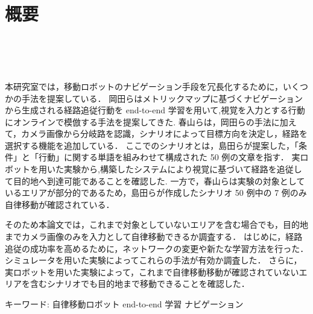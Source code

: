 \chapter*{概要}
\thispagestyle{empty}
%
\begin{center}
  \scalebox{1.0}{視覚と行動のend-to-end学習により}\\
  \vspace{-1.0zh}
  \scalebox{1.0}{経路追従行動をオンラインで模倣する手法の提案}\\
  \scalebox{1.0}{-シナリオに基づく目的地へのナビゲーションの改良と調査-}\\
\end{center}
\vspace{1.0zh}

本研究室では，移動ロボットのナビゲーション手段を冗長化するために，いくつかの手法を提案している．
岡田らはメトリックマップに基づくナビゲーションから生成される経路追従行動を end-to-end 学習を用いて,視覚を入力とする行動にオンラインで模倣する手法を提案してきた.
春山らは，岡田らの手法に加えて，カメラ画像から分岐路を認識，シナリオによって目標方向を決定し，経路を選択する機能を追加している．
ここでのシナリオとは，島田らが提案した，「条件」と「行動」に関する単語を組みわせて構成された 50 例の文章を指す．
実ロボットを用いた実験から,構築したシステムにより視覚に基づいて経路を追従して目的地へ到達可能であることを確認した.
一方で，春山らは実験の対象としているエリアが部分的であるため，島田らが作成したシナリオ 50 例中の 7 例のみ自律移動が確認されている．

そのため本論文では，これまで対象としていないエリアを含む場合でも，目的地までカメラ画像のみを入力として自律移動できるか調査する．
はじめに，経路追従の成功率を高めるために，ネットワークの変更や新たな学習方法を行った．
シミュレータを用いた実験によってこれらの手法が有効か調査した．
さらに，実ロボットを用いた実験によって，これまで自律移動移動が確認されていないエリアを含むシナリオでも目的地まで移動できることを確認した．

キーワード: 自律移動ロボット end-to-end 学習 ナビゲーション
%
\newpage
